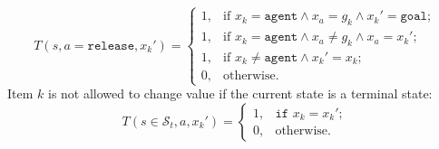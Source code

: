 \begin{equation}\label{eq:Txkrelease}
    T(s,a=\texttt{release}, x_k') = \begin{cases}
             1, & \text{if }x_k =\texttt{agent} \land x_a = g_k \land x_k' = \texttt{goal}; \\
             1, & \text{if }x_k =\texttt{agent} \land x_a \neq g_k \land x_a = x_k'; \\
             1, & \text{if }x_k\neq \texttt{agent} \land x_k'=x_k; \\
             0, & \text{otherwise}. 
             \end{cases}
\end{equation}
Item $k$ is not allowed to change value if the current state is a terminal state:
\begin{equation}\label{eq:Txkts}
    T(s\in\mathcal{S}_t, a, x_k') = \begin{cases}1, &\texttt{if }x_k=x_k';\\
         0,& \text{otherwise}.\end{cases}
\end{equation}
